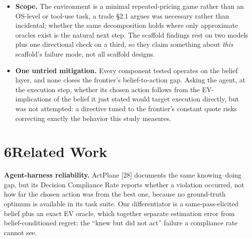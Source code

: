 \documentclass[
  10pt,
]{article}
\newcounter{none} %
\begin{document}
\begin{itemize}
\item
  \textbf{Scope.} The environment is a minimal repeated-pricing game rather than an OS-level or tool-use task, a trade §2.1 argues was necessary rather than incidental; whether the same decomposition holds where only approximate oracles exist is the natural next step. The scaffold findings rest on two models plus one directional check on a third, so they claim something about \emph{this} scaffold's failure mode, not all scaffold designs.
\item
  \textbf{One untried mitigation.} Every component tested operates on the belief layer, and none closes the frontier's belief-to-action gap. Asking the agent, at the execution step, whether its chosen action follows from the EV-implications of the belief it just stated would target execution directly, but was not attempted: a directive tuned to the frontier's constant quote risks correcting exactly the behavior this study measures.
\end{itemize}

\section{6\quad Related Work}\label{related-work}

\textbf{Agent-harness reliability.} ActPlane {[}28{]} documents the same knowing--doing gap, but its Decision Compliance Rate reports whether a violation occurred, not how far the chosen action was from the best one, because no ground-truth optimum is available in its task suite. Our differentiator is a same-pass-elicited belief plus an exact EV oracle, which together separate estimation error from belief-conditioned regret: the ``knew but did not act'' failure a compliance rate cannot see.
\end{document}
